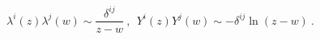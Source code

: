 \begin{equation}
 \lambda^i (z) \lambda^j (w) \sim \frac{\delta^{ij}}{z-w} ~,~~  
 Y^i(z)Y^j(w) \sim -\delta^{ij}\ln (z-w)~.
\end{equation}

